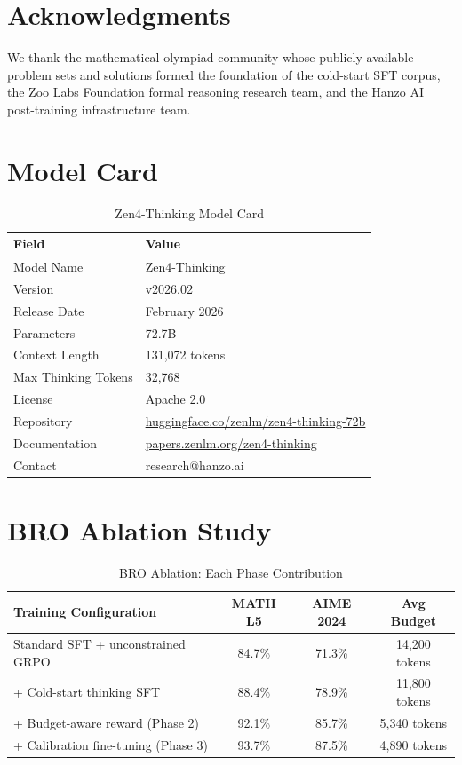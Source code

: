 \documentclass[11pt,a4paper]{article}
\begin{document}
\section*{Acknowledgments}

We thank the mathematical olympiad community whose publicly available problem sets and
solutions formed the foundation of the cold-start SFT corpus, the Zoo Labs Foundation
formal reasoning research team, and the Hanzo AI post-training infrastructure team.




\appendix

\section{Model Card}

\begin{table}[H]
\centering
\begin{tabular}{ll}
\toprule
\textbf{Field} & \textbf{Value} \\
\midrule
Model Name         & Zen4-Thinking \\
Version            & v2026.02 \\
Release Date       & February 2026 \\
Parameters         & 72.7B \\
Context Length     & 131,072 tokens \\
Max Thinking Tokens& 32,768 \\
License            & Apache 2.0 \\
Repository         & \href{https://huggingface.co/zenlm/zen4-thinking-72b}{huggingface.co/zenlm/zen4-thinking-72b} \\
Documentation      & \href{https://papers.zenlm.org/zen4-thinking}{papers.zenlm.org/zen4-thinking} \\
Contact            & research@hanzo.ai \\
\bottomrule
\end{tabular}
\caption{Zen4-Thinking Model Card}
\end{table}

\section{BRO Ablation Study}

\begin{table}[H]
\centering
\begin{tabular}{lccc}
\toprule
\textbf{Training Configuration} & \textbf{MATH L5} & \textbf{AIME 2024} & \textbf{Avg Budget} \\
\midrule
Standard SFT + unconstrained GRPO  & 84.7\% & 71.3\% & 14,200 tokens \\
+ Cold-start thinking SFT          & 88.4\% & 78.9\% & 11,800 tokens \\
+ Budget-aware reward (Phase 2)    & 92.1\% & 85.7\% & 5,340 tokens \\
+ Calibration fine-tuning (Phase 3)& 93.7\% & 87.5\% & 4,890 tokens \\
\bottomrule
\end{tabular}
\caption{BRO Ablation: Each Phase Contribution}
\end{table}
\end{document}
